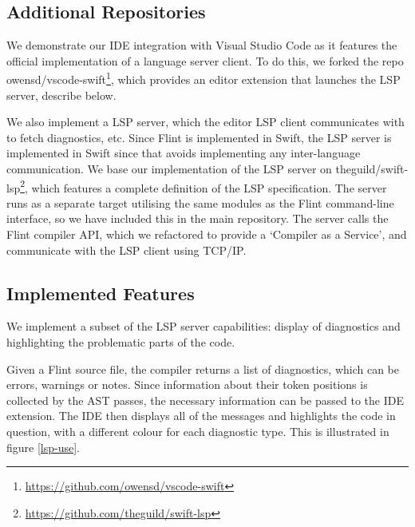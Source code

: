 \subsection{Additional Repositories}

We demonstrate our IDE integration with Visual Studio Code as it features the official implementation of a language server client. To do this, we forked the repo owensd/vscode-swift\footnote{\url{https://github.com/owensd/vscode-swift}}, which provides an editor extension that launches the LSP server, describe below.

We also implement a LSP server, which the editor LSP client communicates with to fetch diagnostics, etc. Since Flint is implemented in Swift, the LSP server is implemented in Swift since that avoids implementing any inter-language communication. We base our implementation of the LSP server on theguild/swift-lsp\footnote{\url{https://github.com/theguild/swift-lsp}}, which features a complete definition of the LSP specification. The server runs as a separate target utilising the same modules as the Flint command-line interface, so we have included this in the main repository. The server calls the Flint compiler API, which we refactored to provide a `Compiler as a Service', and communicate with the LSP client using TCP/IP.

\subsection{Implemented Features}

We implement a subset of the LSP server capabilities: display of diagnostics and highlighting the problematic parts of the code.

Given a Flint source file, the compiler returns a list of diagnostics, which can be errors, warnings or notes. Since information about their token positions is collected by the AST passes, the necessary information can be passed to the IDE extension. The IDE then displays all of the messages and highlights the code in question, with a different colour for each diagnostic type. This is illustrated in figure \ref{lsp-use}.

